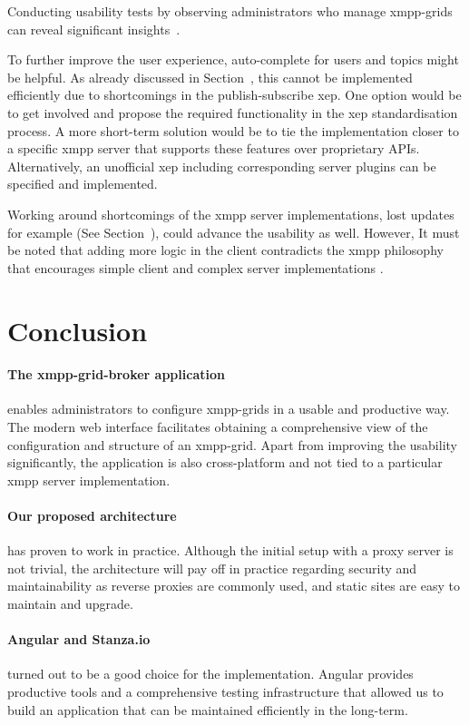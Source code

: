 Conducting usability tests by observing administrators who manage \glspl{xmpp-grid} can reveal significant insights~\cite{krug:dont-make-me-think}.

To further improve the user experience, auto-complete for users and topics might be helpful.
As already discussed in Section~, this cannot be implemented efficiently due to shortcomings in the \gls{publish-subscribe} \gls{xep}.
One option would be to get involved and propose the required functionality in the \gls{xep} standardisation process.
A more short-term solution would be to tie the implementation closer to a specific \gls{xmpp} server that supports these features over proprietary APIs.
Alternatively, an unofficial \gls{xep} including corresponding server plugins can be specified and implemented.

Working around shortcomings of the \gls{xmpp} server implementations, lost updates for example (See Section~), could advance the usability as well.
However, It must be noted that adding more logic in the client contradicts the \gls{xmpp} philosophy that encourages simple client and complex server implementations \cite{definitive-guide-xmpp}.

\section{Conclusion}
\paragraph{The \gls{xmpp-grid-broker} application} enables administrators to configure \glspl{xmpp-grid} in a usable and productive way.
The modern web interface facilitates obtaining a comprehensive view of the configuration and structure of an \gls{xmpp-grid}.
Apart from improving the usability significantly, the application is also cross-platform and not tied to a particular \gls{xmpp} server implementation.

\paragraph{Our proposed architecture} has proven to work in practice.
Although the initial setup with a proxy server is not trivial, the architecture will pay off in practice regarding security and maintainability as reverse proxies are commonly used, and static sites are easy to maintain and upgrade.

\paragraph{Angular and Stanza.io} turned out to be a good choice for the implementation.
Angular provides productive tools and a comprehensive testing infrastructure that allowed us to build an application that can be maintained efficiently in the long-term.


